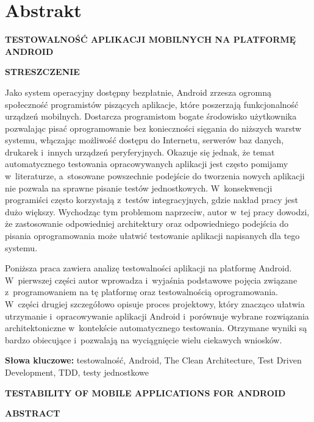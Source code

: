 \chapter*{Abstrakt}
\label{abstract}

\begin{center}
\textbf{TESTOWALNOŚĆ APLIKACJI MOBILNYCH NA PLATFORMĘ ANDROID}

\textbf{STRESZCZENIE}
\end{center}

Jako system operacyjny dostępny bezpłatnie, Android zrzesza ogromną społeczność programistów piszących aplikacje, które poszerzają funkcjonalność urządzeń mobilnych. Dostarcza programistom bogate środowisko użytkownika pozwalając pisać oprogramowanie bez konieczności sięgania do niższych warstw systemu, włączając możliwość dostępu do Internetu, serwerów baz danych, drukarek i~innych urządzeń peryferyjnych. Okazuje się jednak, że temat automatycznego testowania opracowywanych aplikacji jest często pomijamy w~literaturze, a~stosowane powszechnie podejście do tworzenia nowych aplikacji nie pozwala na sprawne pisanie testów jednostkowych. W~konsekwencji programiści często korzystają z~testów integracyjnych, gdzie nakład pracy jest dużo większy. Wychodząc tym problemom naprzeciw, autor w~tej pracy dowodzi, że zastosowanie odpowiedniej architektury oraz odpowiedniego podejścia do pisania oprogramowania może ułatwić testowanie aplikacji napisanych dla tego systemu.  

Poniższa praca zawiera analizę testowalności aplikacji na platformę Android. W~pierwszej części autor wprowadza i~wyjaśnia podstawowe pojęcia związane z~programowaniem na tę platformę oraz testowalnością oprogramowania. W~części drugiej szczegółowo opisuje proces projektowy, który znacząco ułatwia utrzymanie i~opracowywanie aplikacji Android i~porównuje wybrane rozwiązania architektoniczne w~kontekście automatycznego testowania. Otrzymane wyniki są bardzo obiecujące i~pozwalają na wyciągnięcie wielu ciekawych wniosków.

\textbf{Słowa kluczowe:} testowalność, Android, The Clean Architecture, Test Driven Development, TDD, testy jednostkowe

\begin{center}
\textbf{TESTABILITY OF MOBILE APPLICATIONS FOR ANDROID}

\textbf{ABSTRACT}
\end{center}

